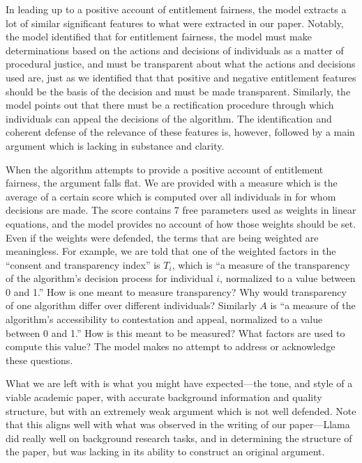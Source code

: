 In leading up to a positive account of entitlement fairness, the model extracts
a lot of similar significant features to what were extracted in our paper.
Notably, the model identified that for entitlement fairness, the model must make
determinations based on the actions and decisions of individuals as a matter of
procedural justice, and must be transparent about what the actions and decisions
used are, just as we identified that that positive and negative entitlement 
features should be the basis of the decision and must be made transparent.
Similarly, the model points out that there must be a rectification procedure
through which individuals can appeal the decisions of the algorithm. The
identification and coherent defense of the relevance of these features is, 
however, followed by a main argument which is lacking in substance and clarity.

When the algorithm attempts to provide a positive account of entitlement
fairness, the argument falls flat. We are provided with a measure which is the
average of a certain score which is computed over all individuals in for whom 
decisions are made. The score contains 7 free parameters used as weights in 
linear equations, and the model provides no account of how those weights should
be set. Even if the weights were defended, the terms that are being weighted are
meaningless. For example, we are told that one of the weighted factors in the
``consent and transparency index'' is $T_i$, which is ``a measure of the 
transparency of the algorithm's decision process for individual $i$, normalized
to a value between 0 and 1.'' How is one meant to measure transparency? Why 
would transparency of one algorithm differ over different individuals? Similarly
$A$ is ``a measure of the algorithm's accessibility to contestation and appeal, 
normalized to a value between 0 and 1.'' How is this meant to be measured? 
What factors are used to compute this value? The model makes no attempt to 
address or acknowledge these questions. 

What we are left with is what you might have expected—the tone, and style of a
viable academic paper, with accurate background information and quality
structure, but with an extremely weak argument which is not well defended. Note 
that this aligns well with what was observed in the writing of our paper—Llama
did really well on background research tasks, and in determining the structure
of the paper, but was lacking in its ability to construct an original argument.
